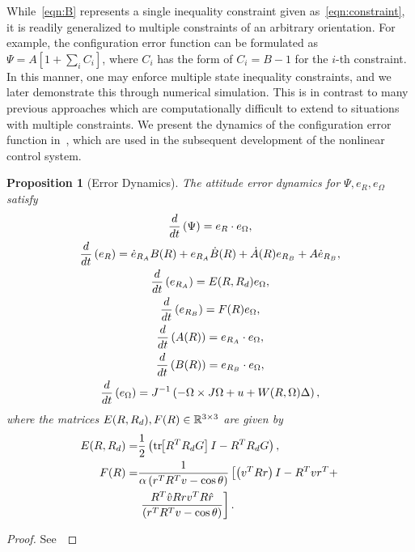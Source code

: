\documentclass[10pt,fleqn]{IJCAS}  %
\newtheorem{prop}{Proposition}
\begin{document}
\begin{multicols}{2}
While~\cref{eqn:B} represents a single inequality constraint given as~\cref{eqn:constraint}, it is readily generalized to multiple constraints of an arbitrary orientation. 
For example, the configuration error function can be formulated as $\Psi=A[1+\sum_i C_i]$, where $C_i$ has the form of $C_i=B-1$ for the $i$-th constraint. 
In this manner, one may enforce multiple state inequality constraints, and we later demonstrate this through numerical simulation. 
This is in contrast to many previous approaches which are computationally difficult to extend to situations with multiple constraints.
We present the dynamics of the configuration error function in~, which are used in the subsequent development of the nonlinear control system.

\begin{prop}[Error Dynamics]\label{prop:error_dyn}
	The attitude error dynamics for \( \Psi, e_R, e_\Omega \) satisfy 
	\begin{gather}
		\frac{d }{d t} \left( \Psi \right) = e_R \cdot e_\Omega , \label{eqn:psi_dot}\\
		\frac{d }{d t} \left( e_R \right) = \dot{e}_{R_A} B(R) + e_{R_A} \dot{B}(R) + \dot{A}(R)e_{R_B} + A \dot{e}_{R_B} , \label{eqn:eR_dot}\\
		\frac{d }{d t} \left( e_{R_A} \right) = E(R, R_d) e_\Omega , \label{eqn:eRA_dot} \\
		\frac{d }{d t} \left( e_{R_B} \right) = F(R) e_\Omega , \label{eqn:eRB_dot} \\
		\frac{d }{d t} \left( A(R) \right) = e_{R_A} \cdot e_\Omega , \label{eqn:A_dot} \\
		\frac{d }{d t} \left( B(R) \right) = e_{R_B} \cdot e_\Omega , \label{eqn:B_dot} \\
		\frac{d }{d t} \left( e_\Omega \right) = J^{-1} \left( -\Omega \times J \Omega + u + W(R, \Omega) \Delta \right) , \label{eqn:eW_dot}
	\end{gather}
	where the matrices \(E(R,R_d), F(R) \in \mathbb{R}^{3\times3} \) are given by
	\begin{align}
		E(R,R_d) = &\frac{1}{2} \left( \mathrm{tr}\negthickspace\left[ R^T R_d G \right]I - R^T R_d G \right) , \label{eqn:E} \\
		F(R) = &\frac{1}{\alpha \left( r^T R^T v - \cos \theta \right)} \left[\left( v^T R r \right) I - R^T v r^T + \right. \nonumber \\
		& \left. \frac{R^T \hat{v} R r v^T R \hat{r}}{\left( r^T R^T v - \cos \theta \right)}\right] . \label{eqn:F}
	\end{align}
\end{prop}
\begin{proof}
See~
\end{proof}


\end{multicols}
\end{document}
